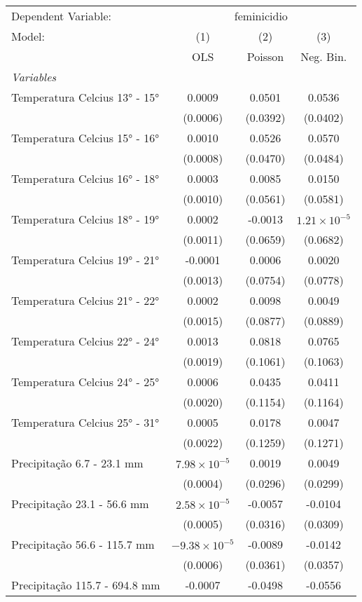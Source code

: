 \documentclass[
]{article}
\begin{document}
\begin{tabular}{lccc}
\tabularnewline\midrule\midrule
Dependent Variable:&\multicolumn{3}{c}{feminicidio}\\
Model:&(1) & (2) & (3)\\
 &  OLS & Poisson & Neg. Bin.\\
\midrule \emph{Variables}&   &   &  \\
Temperatura Celcius 13° - 15° & 0.0009 & 0.0501 & 0.0536\\
  &(0.0006) & (0.0392) & (0.0402)\\
Temperatura Celcius 15° - 16° & 0.0010 & 0.0526 & 0.0570\\
  &(0.0008) & (0.0470) & (0.0484)\\
Temperatura Celcius 16° - 18° & 0.0003 & 0.0085 & 0.0150\\
  &(0.0010) & (0.0561) & (0.0581)\\
Temperatura Celcius 18° - 19° & 0.0002 & -0.0013 & $1.21\times 10^{-5}$\\
  &(0.0011) & (0.0659) & (0.0682)\\
Temperatura Celcius 19° - 21° & -0.0001 & 0.0006 & 0.0020\\
  &(0.0013) & (0.0754) & (0.0778)\\
Temperatura Celcius 21° - 22° & 0.0002 & 0.0098 & 0.0049\\
  &(0.0015) & (0.0877) & (0.0889)\\
Temperatura Celcius 22° - 24° & 0.0013 & 0.0818 & 0.0765\\
  &(0.0019) & (0.1061) & (0.1063)\\
Temperatura Celcius 24° - 25° & 0.0006 & 0.0435 & 0.0411\\
  &(0.0020) & (0.1154) & (0.1164)\\
Temperatura Celcius 25° - 31° & 0.0005 & 0.0178 & 0.0047\\
  &(0.0022) & (0.1259) & (0.1271)\\
Precipitação 6.7 - 23.1 mm & $7.98\times 10^{-5}$ & 0.0019 & 0.0049\\
  &(0.0004) & (0.0296) & (0.0299)\\
Precipitação 23.1 - 56.6 mm & $2.58\times 10^{-5}$ & -0.0057 & -0.0104\\
  &(0.0005) & (0.0316) & (0.0309)\\
Precipitação 56.6 - 115.7 mm & $-9.38\times 10^{-5}$ & -0.0089 & -0.0142\\
  &(0.0006) & (0.0361) & (0.0357)\\
Precipitação 115.7 - 694.8 mm & -0.0007 & -0.0498 & -0.0556\\

\end{tabular}
\end{document}

